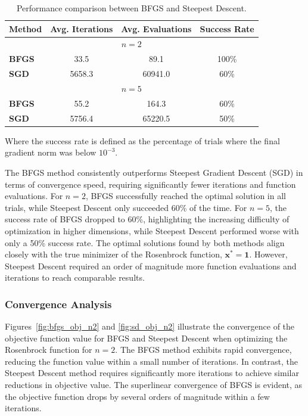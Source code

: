 \documentclass[12pt]{article}
\begin{document}
\begin{table}[h]
    \centering
    \begin{tabular}{lccc}
        \hline
        \textbf{Method} & \textbf{Avg. Iterations} & \textbf{Avg. Evaluations} & \textbf{Success Rate} \\
        \hline
        \multicolumn{4}{c}{$n = 2$} \\
        \textbf{BFGS} & 33.5 & 89.1 & 100\% \\
        \textbf{SGD} & 5658.3 & 60941.0 & 60\% \\
        \hline
        \multicolumn{4}{c}{$n = 5$} \\
        \textbf{BFGS} & 55.2 & 164.3 & 60\% \\
        \textbf{SGD} & 5756.4 & 65220.5 & 50\% \\
        \hline
    \end{tabular}
    \caption{Performance comparison between BFGS and Steepest Descent.}
    \label{tab:bfgs_vs_sd}
\end{table}

Where the success rate is defined as the percentage of trials where the final gradient norm was below \( 10^{-3} \).

The BFGS method consistently outperforms Steepest Gradient Descent (SGD) in terms of convergence speed, requiring significantly fewer iterations and function evaluations. For $n=2$, BFGS successfully reached the optimal solution in all trials, while Steepest Descent only succeeded 60\% of the time. For $n=5$, the success rate of BFGS dropped to 60\%, highlighting the increasing difficulty of optimization in higher dimensions, while Steepest Descent performed worse with only a 50\% success rate. The optimal solutions found by both methods align closely with the true minimizer of the Rosenbrock function, $\mathbf{x}^* = \mathbf{1}$. However, Steepest Descent required an order of magnitude more function evaluations and iterations to reach comparable results. 

\subsubsection{Convergence Analysis}

Figures~\ref{fig:bfgs_obj_n2} and \ref{fig:sd_obj_n2} illustrate the convergence of the objective function value for BFGS and Steepest Descent when optimizing the Rosenbrock function for $n=2$. The BFGS method exhibits rapid convergence, reducing the function value within a small number of iterations. In contrast, the Steepest Descent method requires significantly more iterations to achieve similar reductions in objective value. The superlinear convergence of BFGS is evident, as the objective function drops by several orders of magnitude within a few iterations.
\end{document}
